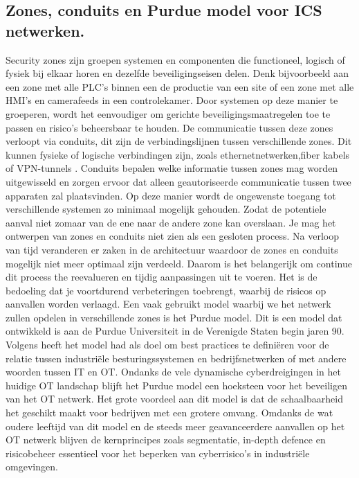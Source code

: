 \subsection{Zones, conduits en Purdue model voor ICS netwerken.}
Security zones zijn groepen systemen en componenten die functioneel, logisch of fysiek bij elkaar horen en dezelfde beveiligingseisen delen. Denk bijvoorbeeld aan een zone met alle PLC’s binnen een de productie van een site of een zone met alle HMI’s en camerafeeds in een controlekamer. Door systemen op deze manier te groeperen, wordt het eenvoudiger om gerichte beveiligingsmaatregelen toe te passen en risico’s beheersbaar te houden. De communicatie tussen deze zones verloopt via conduits, dit zijn de verbindingslijnen tussen verschillende zones. Dit kunnen fysieke of logische verbindingen zijn, zoals ethernetnetwerken,fiber kabels of VPN-tunnels . Conduits bepalen welke informatie tussen zones mag worden uitgewisseld en zorgen ervoor dat alleen geautoriseerde communicatie tussen twee apparaten zal plaatsvinden. Op deze manier wordt de ongewenste toegang tot verschillende systemen zo minimaal mogelijk gehouden. Zodat de potentiele aanval niet zomaar van de ene naar de andere zone kan overslaan. \autocite{Dragos2023}
Je mag het ontwerpen van zones en conduits niet zien als een gesloten process. Na verloop van tijd veranderen er zaken in de architectuur waardoor de zones en conduits mogelijk niet meer optimaal zijn verdeeld. Daarom is het belangerijk om continue dit process the reevalueren en tijdig aanpassingen uit te voeren. Het is de bedoeling dat je voortdurend verbeteringen toebrengt, waarbij de risicos op aanvallen worden verlaagd. \autocite{Incibe2018}
Een vaak gebruikt model waarbij we het netwerk zullen opdelen in verschillende zones is het Purdue model. Dit is een model dat ontwikkeld is aan de Purdue Universiteit in de Verenigde Staten begin jaren 90. Volgens \textcite{Mathezer2021}heeft het model had als doel om best practices te definiëren voor de relatie tussen industriële besturingssystemen en bedrijfsnetwerken of met andere woorden tussen IT en OT. 
Ondanks de vele dynamische cyberdreigingen in het huidige OT landschap blijft het Purdue model een hoeksteen voor het beveiligen van het OT netwerk. Het grote voordeel aan dit model is dat de schaalbaarheid het geschikt maakt voor bedrijven met een grotere omvang. Omdanks de wat oudere leeftijd van dit model en de steeds meer geavanceerdere aanvallen op het OT netwerk blijven de kernprincipes zoals segmentatie, in-depth defence en risicobeheer essentieel voor het beperken van cyberrisico's in industriële omgevingen.





